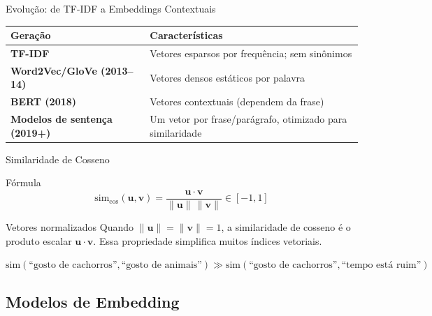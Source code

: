 \documentclass[aspectratio=169]{beamer}
\begin{document}
\begin{frame}[shrink=5]{Evolução: de TF-IDF a Embeddings Contextuais}
    \begin{center}\footnotesize
    \begin{tabular}{>{\bfseries}p{3.2cm}p{7.6cm}}
    \toprule
    Geração & Características \\
    \midrule
    TF-IDF & Vetores esparsos por frequência; sem sinônimos \\
    Word2Vec/GloVe (2013--14) & Vetores densos estáticos por palavra \\
    BERT (2018) & Vetores contextuais (dependem da frase) \\
    Modelos de sentença (2019+) & Um vetor por frase/parágrafo, otimizado para similaridade \\
    \bottomrule
    \end{tabular}
    \end{center}
\end{frame}

\begin{frame}{Similaridade de Cosseno}
    \begin{block}{Fórmula}
        \[
          \text{sim}_{\cos}(\mathbf{u}, \mathbf{v}) = \frac{\mathbf{u} \cdot \mathbf{v}}{\|\mathbf{u}\|\,\|\mathbf{v}\|} \in [-1, 1]
        \]
    \end{block}
    \pause
    \begin{alertblock}{Vetores normalizados}
        \footnotesize Quando $\|\mathbf{u}\|=\|\mathbf{v}\|=1$, a similaridade de cosseno é o produto escalar $\mathbf{u}\cdot\mathbf{v}$. Essa propriedade simplifica muitos índices vetoriais.
    \end{alertblock}
    \pause
    \begin{exampleblock}{}
        \footnotesize $\text{sim}(\text{``gosto de cachorros''}, \text{``gosto de animais''}) \gg \text{sim}(\text{``gosto de cachorros''}, \text{``tempo está ruim''})$
    \end{exampleblock}
\end{frame}

\subsection{Modelos de Embedding}
\end{document}
